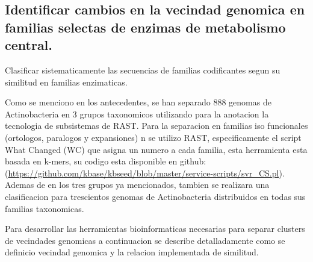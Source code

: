 \documentclass[12pt,twoside]{reedthesis}
\begin{document}
  \subsection{Identificar cambios en la vecindad genomica en familias
  selectas de enzimas de metabolismo
  central.}\label{identificar-cambios-en-la-vecindad-genomica-en-familias-selectas-de-enzimas-de-metabolismo-central.-1}
  
  Clasificar sistematicamente las secuencias de familias codificantes
  segun su similitud en familias enzimaticas.
  
  Como se menciono en los antecedentes, se han separado 888 genomas de
  Actinobacteria en 3 grupos taxonomicos utilizando para la anotacion la
  tecnologia de subsistemas de RAST. Para la separacion en familias iso
  funcionales (ortologos, paralogos y expansiones) n se utilizo RAST,
  especificamente el script What Changed (WC) que asigna un numero a cada
  familia, esta herramienta esta basada en k-mers, su codigo esta
  disponible en github:
  (\url{https://github.com/kbase/kbseed/blob/master/service-scripts/svr_CS.pl}).
  Ademas de en los tres grupos ya mencionados, tambien se realizara una
  clasificacion para trescientos genomas de Actinobacteria distribuidos en
  todas sus familias taxonomicas.
  
  Para desarrollar las herramientas bioinformaticas necesarias para
  separar clusters de vecindades genomicas a continuacion se describe
  detalladamente como se definicio vecindad genomica y la relacion
  implementada de similitud.
  
\end{document}
